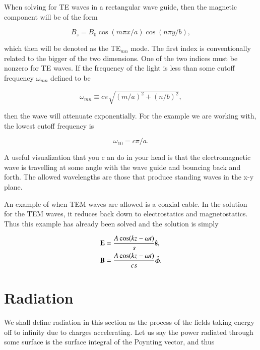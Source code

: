 \documentclass[preprint, review,12pt]{elsarticle}
\def\b{\textbf}
\def\={\equiv}
\newcommand{\hb}[1]{\hat{\b #1}}
\newcommand{\hbm}[1]{\hat{\bm #1}}
\begin{document}
When solving for TE waves in a rectangular wave guide, then the magnetic component will be of the form

\begin{equation}
    B_z = B_0 \cos(m\pi x/a)\cos(n \pi y/b),
\end{equation}

which then will be denoted as the TE$_{mn}$ mode. The first index is conventionally related to the bigger of the two dimensions. One of the two indices must be nonzero for TE waves. If the frequency of the light is less than some cutoff frequency $\omega_{mn}$ defined to be

\begin{equation}
    \omega_{mn} \= c \pi \sqrt{(m/a)^2 + (n/b)^2},
\end{equation}

then the wave will attenuate exponentially. For the example we are working with, the lowest cutoff frequency is 

\begin{equation}
    \omega_{10} = c \pi /a.
\end{equation}

A useful visualization that you c an do in your head is that the electromagnetic wave is travelling at some angle with the wave guide and bouncing back and forth. The allowed wavelengths are those that produce standing waves in the x-y plane. 

An example of when TEM waves are allowed is a coaxial cable. In the solution for the TEM waves, it reduces back down to electrostatics and magnetostatics. Thus this example has already been solved and the solution is simply

\begin{equation}
\begin{split}
    & \b E = \frac{A\cos(kz-\omega t)}{s}\hb{s}, \\
    & \b B = \frac{A\cos(kz-\omega t)}{cs}\hbm{\phi}.
\end{split}
\end{equation}

\section{Radiation}

We shall define radiation in this section as the process of the fields taking energy off to infinity due to charges accelerating. Let us say the power radiated through some surface is the surface integral of the Poynting vector, and thus
\end{document}
